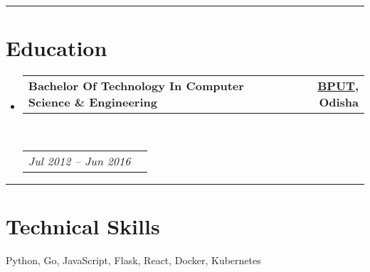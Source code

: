 \documentclass[10pt,a4paper,hidelinks]{article}
\makeatletter
\newenvironment{indentsection}[1]%
{\begin{list}{}%
	{\setlength{\leftmargin}{#1}}%
	\item[]%
}
{\end{list}}
\newcommand{\headerrow}[2]
{\begin{tabular*}{\linewidth}{l@{\extracolsep{\fill}}r}
	#1 &
	#2 \\
\end{tabular*}}
\makeatother
\begin{document}



{\color{IFLightBlue} \hrule}
\vspace{-0.3em}
{\color{IFMediumBlue}\section*{Education}}

\begin{itemize}
	\parskip=0.1em

	\item 
	\headerrow
		{\textbf{Bachelor Of Technology In Computer Science \& Engineering}}
		{\textbf{\colorbox{IFLightBlue!10}{\href{http://www.bput.ac.in}{{BPUT}}}{, Odisha}}}
	\\
	\headerrow
		{\emph{Jul 2012 -- Jun 2016}}
		{\emph{}}

\end{itemize}


{\color{IFLightBlue} \hrule}
\vspace{-0.3em}
{\color{IFMediumBlue}\section*{Technical Skills}}

\begin{indentsection}{\parindent}
\begin{description*}
    Python, Go, JavaScript, Flask, React, Docker, Kubernetes
\end{description*}
\end{indentsection}
\end{document}
